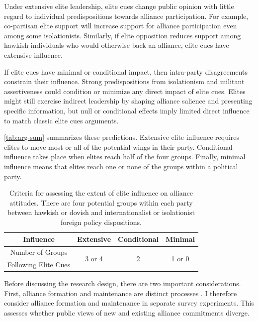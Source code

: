 \documentclass[12pt]{article}
\begin{document}
Under extensive elite leadership, elite cues change public opinion with little regard to individual predispositions towards alliance participation. 
For example, co-partisan elite support will increase support for alliance participation even among some isolationists. 
Similarly, if elite opposition reduces support among hawkish individuals who would otherwise back an alliance, elite cues have extensive influence. 


If elite cues have minimal or conditional impact, then intra-party disagreements constrain their influence.
Strong predispositions from isolationism and militant assertiveness could condition or minimize any direct impact of elite cues.
Elites might still exercise indirect leadership by shaping alliance salience and presenting specific information, but null or conditional effects imply limited direct influence to match classic elite cues arguments. 


\autoref{tab:arg-sum} summarizes these predictions. 
Extensive elite influence requires elites to move most or all of the potential wings in their party. 
Conditional influence takes place when elites reach half of the four groups. 
Finally, minimal influence means that elites reach one or none of the groups within a political party.


\begin{table}[hbt!]
\begin{center}
\begin{tabular}{| c | c | c | c |}
\hline
   Influence          & Extensive & Conditional & Minimal  \\
\hline
   Number of Groups   & \multirow{2}{*}{3 or 4}  & \multirow{2}{*}{2}  & \multirow{2}{*}{1 or 0} \\
   Following Elite Cues     &           &             &  \\
\hline
\end{tabular}
\caption{Criteria for assessing the extent of elite influence on alliance attitudes. There are four potential groups within each party between hawkish or dovish and internationalist or isolationist foreign policy dispositions.}
\label{tab:arg-sum}
\end{center} 
\end{table}



Before discussing the research design, there are two important considerations. 
First, alliance formation and maintenance are distinct processes \citep{Snyder1997}. 
I therefore consider alliance formation and maintenance in separate survey experiments.
This assesses whether public views of new and existing alliance commitments diverge. 
\end{document}
